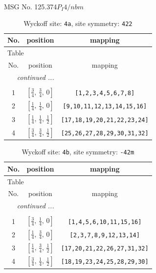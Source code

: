 \documentclass[fleqn,8pt]{jsarticle}
\begin{document}
\setcounter{MaxMatrixCols}{32}

\renewcommand{\tablename}{Table~}
\renewcommand{\figurename}{Figure~}
\begin{center}
\LARGE
MSG No. 125.374\quad$P_{I}4/nbm$
\end{center}
\renewcommand{\arraystretch}{1.2}
\begin{longtable}{ccc}
\caption{Wyckoff site: {\tt 4a}, site symmetry: {\tt 422}}
 \\
 \hline \hline
No. & position & mapping \\ \hline \endfirsthead

\multicolumn{2}{l}{\tablename\ \thetable{}} \\
 \hline \hline
No. & position & mapping \\ \hline \endhead

 \hline \hline
\multicolumn{2}{r}{\footnotesize\it continued ...} \\ \endfoot

 \hline \hline
\multicolumn{2}{r}{} \\ \endlastfoot

1 & $\left[ \frac{3}{4},\, \frac{3}{4},\, 0 \right]$ & {\tt [1,2,3,4,5,6,7,8]} \\ \hline
2 & $\left[ \frac{1}{4},\, \frac{1}{4},\, 0 \right]$ & {\tt [9,10,11,12,13,14,15,16]} \\ \hline
3 & $\left[ \frac{1}{4},\, \frac{1}{4},\, \frac{1}{2} \right]$ & {\tt [17,18,19,20,21,22,23,24]} \\ \hline
4 & $\left[ \frac{3}{4},\, \frac{3}{4},\, \frac{1}{2} \right]$ & {\tt [25,26,27,28,29,30,31,32]} \\
\end{longtable}
\renewcommand{\arraystretch}{1.2}
\begin{longtable}{ccc}
\caption{Wyckoff site: {\tt 4b}, site symmetry: {\tt -42m}}
 \\
 \hline \hline
No. & position & mapping \\ \hline \endfirsthead

\multicolumn{2}{l}{\tablename\ \thetable{}} \\
 \hline \hline
No. & position & mapping \\ \hline \endhead

 \hline \hline
\multicolumn{2}{r}{\footnotesize\it continued ...} \\ \endfoot

 \hline \hline
\multicolumn{2}{r}{} \\ \endlastfoot

1 & $\left[ \frac{3}{4},\, \frac{1}{4},\, 0 \right]$ & {\tt [1,4,5,6,10,11,15,16]} \\ \hline
2 & $\left[ \frac{1}{4},\, \frac{3}{4},\, 0 \right]$ & {\tt [2,3,7,8,9,12,13,14]} \\ \hline
3 & $\left[ \frac{1}{4},\, \frac{3}{4},\, \frac{1}{2} \right]$ & {\tt [17,20,21,22,26,27,31,32]} \\ \hline
4 & $\left[ \frac{3}{4},\, \frac{1}{4},\, \frac{1}{2} \right]$ & {\tt [18,19,23,24,25,28,29,30]} \\
\end{longtable}
\end{document}
